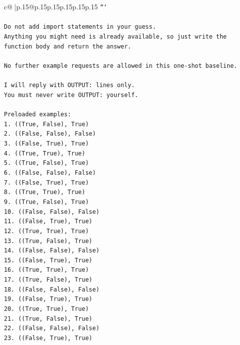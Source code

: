 \documentclass{article}
\begin{document}
{\begin{supertabular}{c@{$\;$}|p{.15\linewidth}@{}p{.15\linewidth}p{.15\linewidth}p{.15\linewidth}p{.15\linewidth}p{.15\linewidth}}
{{{\texttt{```} \\
\\ 
\texttt{Do not add import statements in your guess.} \\
\texttt{Anything you might need is already available, so just write the function body and return the answer.} \\
\\ 
\texttt{No further example requests are allowed in this one{-}shot baseline.} \\
\\ 
\texttt{I will reply with OUTPUT: lines only.} \\
\texttt{You must never write OUTPUT: yourself.} \\
\\ 
\texttt{Preloaded examples:} \\
\texttt{1. ((True, False), True)} \\
\texttt{2. ((False, False), False)} \\
\texttt{3. ((False, True), True)} \\
\texttt{4. ((True, True), True)} \\
\texttt{5. ((True, False), True)} \\
\texttt{6. ((False, False), False)} \\
\texttt{7. ((False, True), True)} \\
\texttt{8. ((True, True), True)} \\
\texttt{9. ((True, False), True)} \\
\texttt{10. ((False, False), False)} \\
\texttt{11. ((False, True), True)} \\
\texttt{12. ((True, True), True)} \\
\texttt{13. ((True, False), True)} \\
\texttt{14. ((False, False), False)} \\
\texttt{15. ((False, True), True)} \\
\texttt{16. ((True, True), True)} \\
\texttt{17. ((True, False), True)} \\
\texttt{18. ((False, False), False)} \\
\texttt{19. ((False, True), True)} \\
\texttt{20. ((True, True), True)} \\
\texttt{21. ((True, False), True)} \\
\texttt{22. ((False, False), False)} \\
\texttt{23. ((False, True), True)} \\
}}}
\end{supertabular}}
\end{document}
